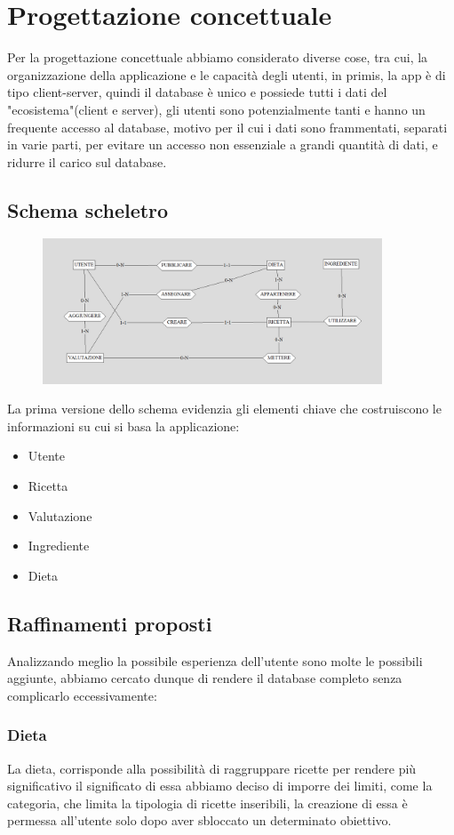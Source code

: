 ﻿\documentclass[a4paper,12pt]{report}
\begin{document}
\chapter{Progettazione concettuale}
Per la progettazione concettuale abbiamo considerato diverse cose,
tra cui, la organizzazione della applicazione e le capacità degli utenti,
in primis, la app è di tipo client-server, quindi il database è unico e
possiede tutti i dati del "ecosistema"(client e server), gli utenti sono potenzialmente tanti
e hanno un frequente accesso al database, motivo per il cui i dati sono
frammentati, separati in varie parti, per evitare un accesso non essenziale a grandi quantità di dati, e ridurre il carico sul database.    
\section{Schema scheletro}
\begin{figure}[H]
    \centering
   \includegraphics[width=0.9\textwidth]{app_images/schema-scheletro.png}  
    \label{fig:example}
\end{figure}
La prima versione dello schema evidenzia gli elementi chiave 
che costruiscono le informazioni su cui si basa la applicazione:
\begin{itemize}
    \item Utente
    \item Ricetta
    \item Valutazione
    \item Ingrediente
    \item Dieta
\end{itemize}

\section{Raffinamenti proposti}
Analizzando meglio la possibile esperienza dell'utente
sono molte le possibili aggiunte, abbiamo cercato
dunque di rendere il database completo senza complicarlo eccessivamente:
\subsection{Dieta}
La dieta, corrisponde alla possibilità di raggruppare ricette
per rendere più significativo il significato di essa abbiamo deciso di 
imporre dei limiti, come la categoria, che limita la tipologia di ricette 
inseribili, la creazione di essa è permessa all'utente solo dopo aver sbloccato un determinato obiettivo.
\end{document}
